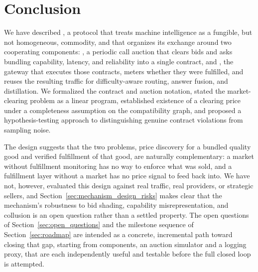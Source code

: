 \section{Conclusion}
\label{sec:conclusion}

We have described \Noesis, a protocol that treats machine intelligence as
a fungible, but not homogeneous, commodity, and that organizes its
exchange around two cooperating components: \NoesisMarket, a periodic
call auction that clears bids and asks bundling capability, latency, and
reliability into a single contract, and \NoesisServer, the gateway that
executes those contracts, meters whether they were fulfilled, and reuses
the resulting traffic for difficulty-aware routing, answer fusion, and
distillation. We formalized the contract and auction notation, stated the
market-clearing problem as a linear program, established existence of a
clearing price under a completeness assumption on the compatibility
graph, and proposed a hypothesis-testing approach to distinguishing
genuine contract violations from sampling noise.

The design suggests that the two problems, price discovery for a bundled
quality good and verified fulfillment of that good, are naturally
complementary: a market without fulfillment monitoring has no way to
enforce what was sold, and a fulfillment layer without a market has no
price signal to feed back into. We have not, however, evaluated this
design against real traffic, real providers, or strategic sellers, and
Section~\ref{sec:mechanism_design_risks} makes clear that the mechanism's
robustness to bid shading, capability misrepresentation, and collusion is
an open question rather than a settled property. The open questions of
Section~\ref{sec:open_questions} and the milestone sequence of
Section~\ref{sec:roadmap} are intended as a concrete, incremental path
toward closing that gap, starting from components, an auction simulator
and a logging proxy, that are each independently useful and testable
before the full closed loop is attempted.
